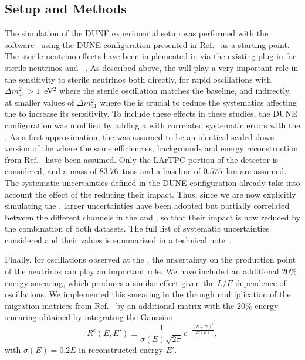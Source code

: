 \subsection{Setup and Methods}
The simulation of the DUNE experimental setup was performed with the   software~\cite{Huber:2004ka,Huber:2007ji} using the DUNE  configuration presented in Ref.~\cite{Alion:2016uaj} as a starting point. The sterile neutrino effects have been implemented in   via the existing plug-in for sterile neutrinos and ~\cite{Joachim}. As described above, the  will play a very important role in the sensitivity to sterile neutrinos both directly, for rapid oscillations with $\Delta m_{41}^2 > 1$~eV$^2$ where the sterile oscillation matches the  baseline, and indirectly, at smaller values of $\Delta m_{41}^2$ where the  is crucial to reduce the systematics affecting the  to increase its sensitivity. To include these  effects in these studies, the   DUNE  configuration was modified by adding a  with correlated systematic errors with the . As a first approximation, the  was assumed to be an identical scaled-down version of the  where the same efficiencies, backgrounds and energy reconstruction from Ref.~\cite{Alion:2016uaj} have been assumed. Only the LArTPC portion of the detector is considered, and a mass of $83.76$~tons and a baseline of $0.575$~km are assumed. The systematic uncertainties defined in the   DUNE  configuration already take into account the effect of the  reducing their impact. Thus, since we are now explicitly simulating the , larger uncertainties have been adopted but partially correlated between the different channels in the  and , so that their impact is now reduced by the combination of both datasets. The full list of systematic uncertainties considered and their values is summarized in a technical note~\cite{ref:dune-sterile-note}.

Finally, for oscillations observed at the , the uncertainty on the production point of the neutrinos can play an important role. We have included an additional $20\%$ energy smearing, which produces a similar effect given the $L/E$ dependence of oscillations. We implemented this smearing in the  through multiplication of the migration matrices from Ref.~\cite{Alion:2016uaj} by an additional matrix with the $20\%$ energy smearing obtained by integrating the Gaussian
\begin{equation}
R^c(E,E')\equiv\frac{1}{\sigma(E)\sqrt{2\pi}}e^{-\frac{(E-E')^2}{2\sigma(E)}},
\label{R_mat}
\end{equation}
with $\sigma(E)=0.2 E$ in reconstructed energy $E'$.

